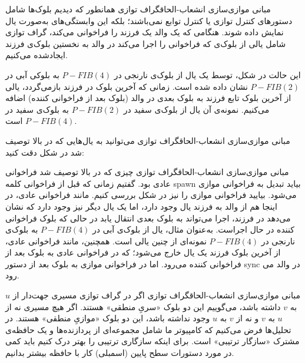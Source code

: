 \begin{itemframe-s}{مبانی موازی‌سازی انشعاب-الحاق}{گراف توازی}
\itm
همانطور که دیدیم بلوک‌ها شامل دستورهای کنترل توازی یا کنترل توابع نمی‌باشند؛ بلکه این وابستگی‌های به‌صورت یال نمایش داده شوند.
\itm
هنگامی که یک والد یک فرزند را فراخوانی می‌کند، گراف توازی شامل یالی
از بلوک‌ی که فراخوانی را اجرا می‌کند در والد به نخستین بلوک‌ی فرزند ایجادشده می‌کنیم.

 این حالت در شکل، توسط یک یال از بلوک‌ی نارنجی در
$P-FIB(4)$
به بلوکی آبی در
$P-FIB(2)$
نشان داده شده است.
\itm
زمانی که آخرین بلوک در فرزند بازمی‌گردد، یالی از آخرین بلوک تابع فرزند به بلوک بعدی در والد (بلوک بعد از فراخوانی کننده) اضافه می‌کنیم.
نمونه‌ی آن یال از بلوک‌ی سفید در
$P-FIB(2)$
به بلوک‌ی سفید در
$P-FIB(4)$
است.
\end{itemframe-s}


\begin{itemframe-s}{مبانی موازی‌سازی انشعاب-الحاق}{گراف توازی}
\itm
می‌توانید به یال‌هایی که در بالا توصیف شد در شکل دقت کنید:
\end{itemframe-s}


\begin{itemframe-s}{مبانی موازی‌سازی انشعاب-الحاق}{گراف توازی}
\itm
چیزی که در بالا توصیف شد فراخوانی عادی بود. گفتیم زمانی که قبل از فراخوانی کلمه spawn بیاید تبدیل به فراخوانی موازی می‌شود. بیایید فراخوانی موازی را نیز در شکل بررسی کنیم.
\itm
مانند فراخوانی عادی، در اینجا هم از والد به فرزند یال وجود دارد، اما یک یال دیگر نیز وجود دارد
که نشان می‌دهد در فرزند، اجرا می‌تواند به بلوک بعدی انتقال یابد در حالی که بلوک فراخوانی کننده در حال اجراست.
\itm
به‌عنوان مثال، یال از بلوک‌ی آبی در
$P-FIB(4)$
به بلوک‌ی نارنجی در
$P-FIB(4)$
نمونه‌ای از چنین یالی است.
\itm
همچنین، مانند فراخوانی عادی، از آخرین بلوک فرزند یک یال خارج می‌شود؛ که در فراخوانی عادی به بلوک بعد از فراخوانی کننده می‌رود.
اما در فراخوانی موازی به بلوک بعد از دستور sync در والد می رود.
\end{itemframe-s}


\begin{itemframe-s}{مبانی موازی‌سازی انشعاب-الحاق}{گراف توازی}
\itm
اگر در گراف توازی مسیری جهت‌دار از $u$ به $v$ داشته باشد، می‌گوییم این دو بلوک «سریِ منطقی» هستند.
اگر هیچ مسیری نه از $u$ به $v$ و نه از $v$ به $u$ وجود نداشته باشد، این دو بلوک «موازیِ منطقی»
هستند.
\itm
در تحلیل‌ها فرض می‌کنیم که کامپیوتر ما شامل مجموعه‌ای از پردازنده‌ها و یک حافظه‌ی مشترک «سازگار ترتیبی»
است.
\itm
برای اینکه سازگاری ترتیبی را بهتر درک کنیم باید کمی در مورد دستورات سطح پایین (اسمبلی) کار با حافظه بیشتر بدانیم.
\end{itemframe-s}


